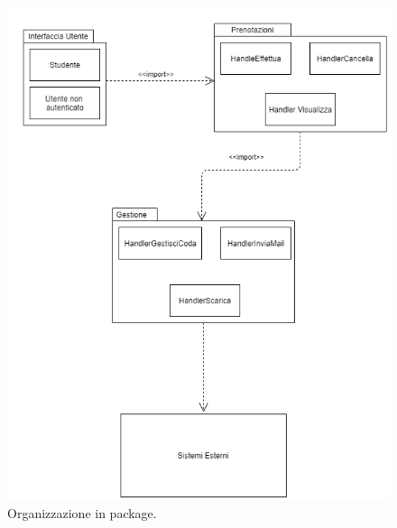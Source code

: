 \begin{figure}[H]
\begin{center}
  \includegraphics[width=0.8 \textwidth]{Figure/package.png}
    \caption{Organizzazione in package.}\label{figura: package}
\end{center}
\end{figure}

